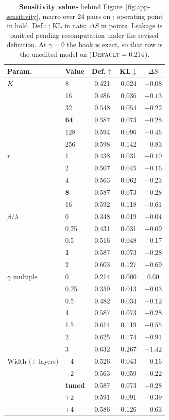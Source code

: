 \begin{table}[!htbp]
  \centering
  \footnotesize
  \setlength{\tabcolsep}{3.5pt}
  \begin{tabular}{@{}llccc@{}}
    \toprule
    \textbf{Param.} & \textbf{Value} & \textbf{Def.}$\uparrow$ & \textbf{KL}$\downarrow$ & \textbf{$\Delta S$} \\
    \midrule
    $K$ & 8 & 0.421 & 0.024 & $-0.08$ \\
     & 16 & 0.486 & 0.036 & $-0.13$ \\
     & 32 & 0.548 & 0.054 & $-0.22$ \\
     & \textbf{64} & 0.587 & 0.073 & $-0.28$ \\
     & 128 & 0.594 & 0.096 & $-0.46$ \\
     & 256 & 0.598 & 0.142 & $-0.83$ \\
    \midrule
    $r$ & 1 & 0.438 & 0.031 & $-0.10$ \\
     & 2 & 0.507 & 0.045 & $-0.16$ \\
     & 4 & 0.563 & 0.062 & $-0.23$ \\
     & \textbf{8} & 0.587 & 0.073 & $-0.28$ \\
     & 16 & 0.592 & 0.118 & $-0.61$ \\
    \midrule
    $\beta/\lambda$ & 0 & 0.348 & 0.019 & $-0.04$ \\
     & 0.25 & 0.431 & 0.031 & $-0.09$ \\
     & 0.5 & 0.516 & 0.048 & $-0.17$ \\
     & \textbf{1} & 0.587 & 0.073 & $-0.28$ \\
     & 2 & 0.603 & 0.127 & $-0.69$ \\
    \midrule
    $\gamma$ multiple & 0 & 0.214 & 0.000 & 0.00 \\
     & 0.25 & 0.359 & 0.013 & $-0.03$ \\
     & 0.5 & 0.482 & 0.034 & $-0.12$ \\
     & \textbf{1} & 0.587 & 0.073 & $-0.28$ \\
     & 1.5 & 0.614 & 0.119 & $-0.55$ \\
     & 2 & 0.625 & 0.174 & $-0.91$ \\
     & 3 & 0.632 & 0.267 & $-1.42$ \\
    \midrule
    Width ($\pm$ layers) & $-$4 & 0.526 & 0.043 & $-0.16$ \\
     & $-$2 & 0.563 & 0.059 & $-0.22$ \\
     & \textbf{tuned} & 0.587 & 0.073 & $-0.28$ \\
     & +2 & 0.591 & 0.091 & $-0.39$ \\
     & +4 & 0.586 & 0.126 & $-0.63$ \\
    \bottomrule
  \end{tabular}
  \caption{\textbf{Sensitivity values} behind Figure~\ref{fig:app-sensitivity}, macro over 24 pairs on \Ddev; operating point in bold. Def.: ; KL in nats; $\Delta S$ in points. Leakage is omitted pending recomputation under the revised definition. At $\gamma=0$ the hook is exact, so that row is the unedited model on \Ddev ($\textsc{Default}=0.214$).}
  \label{tab:app-sensitivity}
\end{table}

